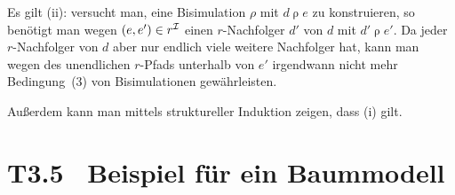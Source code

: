 \documentclass[fontsize=11pt, twoside=false, numbers=autoenddot]{scrbook}
\begin{document}
\begin{beweis}
\begin{center}
\begin{tikzpicture}
    \end{tikzpicture}%
  \end{center}
  Es gilt (ii):
  versucht man, eine Bisimulation $\rho$ mit $d\mathbin{\rho}e$ zu konstruieren,
  so benötigt man wegen $(e,e') \in r^\Imc$ einen $r$-Nachfolger $d'$ von $d$
  mit $d' \mathbin{\rho} e'$.
  Da jeder $r$-Nachfolger von $d$ aber nur endlich viele weitere Nachfolger hat,
  kann man wegen des unendlichen $r$-Pfads unterhalb von $e'$
  irgendwann nicht mehr Bedingung~(3) von Bisimulationen gewährleisten.
  
  \parII
  Außerdem kann man mittels struktureller Induktion zeigen, dass (i) gilt.
  \qedhere
\end{beweis}

\section*{T3.5~ Beispiel für ein Baummodell}
\end{document}

